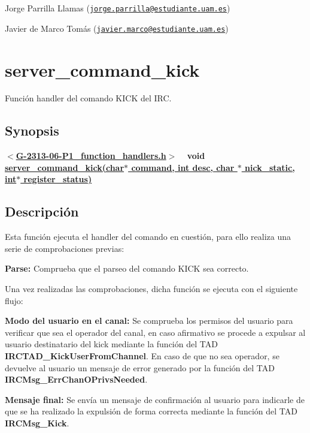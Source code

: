 \begin{DoxyItemize}
\item Jorge Parrilla Llamas (\href{mailto:jorge.parrilla@estudiante.uam.es}{\tt jorge.\+parrilla@estudiante.\+uam.\+es}) 
\item Javier de Marco Tomás (\href{mailto:javier.marco@estudiante.uam.es}{\tt javier.\+marco@estudiante.\+uam.\+es}) 
\end{DoxyItemize}\hypertarget{server_command_kick}{}\section{server\+\_\+command\+\_\+kick}\label{server_command_kick}
Función handler del comando K\+I\+CK del I\+RC.\hypertarget{server_command_kick_synopsis_kick}{}\subsection{Synopsis}\label{server_command_kick_synopsis_kick}
{ {\bfseries $<$\hyperlink{G-2313-06-P1__function__handlers_8h}{G-\/2313-\/06-\/\+P1\+\_\+function\+\_\+handlers.\+h}$>$} ~\newline
 {\bfseries void \hyperlink{G-2313-06-P1__function__handlers_8c_a33025bd9c7bf8fbb2bf9cf722c07465c}{server\+\_\+command\+\_\+kick(char$\ast$ command, int desc, char $\ast$ nick\+\_\+static, int$\ast$ register\+\_\+status)}} } \hypertarget{server_command_kick_descripcion_kick}{}\subsection{Descripción}\label{server_command_kick_descripcion_kick}
Esta función ejecuta el handler del comando en cuestión, para ello realiza una serie de comprobaciones previas\+:


\begin{DoxyItemize}
\item {\bfseries Parse\+:} Comprueba que el parseo del comando K\+I\+CK sea correcto. 
\end{DoxyItemize}

Una vez realizadas las comprobaciones, dicha función se ejecuta con el siguiente flujo\+:


\begin{DoxyItemize}
\item {\bfseries Modo del usuario en el canal\+:} Se comprueba los permisos del usuario para verificar que sea el operador del canal, en caso afirmativo se procede a expulsar al usuario destinatario del kick mediante la función del T\+AD {\bfseries I\+R\+C\+T\+A\+D\+\_\+\+Kick\+User\+From\+Channel}. En caso de que no sea operador, se devuelve al usuario un mensaje de error generado por la función del T\+AD {\bfseries I\+R\+C\+Msg\+\_\+\+Err\+Chan\+O\+Privs\+Needed}.  
\item {\bfseries Mensaje final\+:} Se envía un mensaje de confirmación al usuario para indicarle de que se ha realizado la expulsión de forma correcta mediante la función del T\+AD {\bfseries I\+R\+C\+Msg\+\_\+\+Kick}.  
\end{DoxyItemize}

